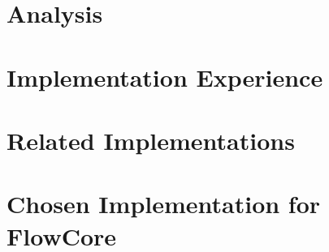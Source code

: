 \section{Analysis}
\label{sec:analysis}

\section{Implementation Experience}
\label{sec:experience}

\section{Related Implementations}
\label{sec:related-work}

\section{Chosen Implementation for FlowCore}
\label{sec:conclusion}
